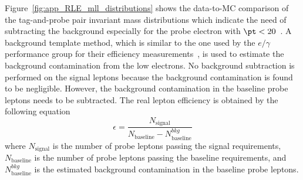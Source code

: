 \begin{table}[htbp]
    \caption{The list of single lepton and dilepton triggers used for the real lepton efficiency measurements.
    The dilepton triggers are used for studying the systematic uncertainties causing by the trigger.}
    \label{tab:app_RLE_single_lepton_triggers}
\end{table}

Figure~\ref{fig:app_RLE_mll_distributions} shows the data-to-MC comparison of the tag-and-probe pair invariant mass distributions which indicate the need of subtracting the background especially for the probe electron with $\pt < 20$~{\GeV}.
A background template method, which is similar to the one used by the $e/\gamma$ performance group for their efficiency measurements~\cite{ATLAS-CONF-2014-018}, is used to estimate the background contamination from the low \pt electrons.
No background subtraction is performed on the signal leptons because the background contamination is found to be negligible.
However, the background contamination in the baseline probe leptons needs to be subtracted.
The real lepton efficiency is obtained by the following equation
%
\begin{equation}
    \epsilon = \frac{N_{\mathrm{signal}}}{N_{\mathrm{baseline}} - N_{\mathrm{baseline}}^{bkg}}
    \label{eq:app_RLE_efficiency_formula}
\end{equation}
%
where $N_\mathrm{signal}$ is the number of probe leptons passing the signal requirements, $N_\mathrm{baseline}$ is the number of probe leptons passing the baseline requirements, and $N_\mathrm{baseline}^{bkg}$ is the estimated background contamination in the baseline probe leptons.

